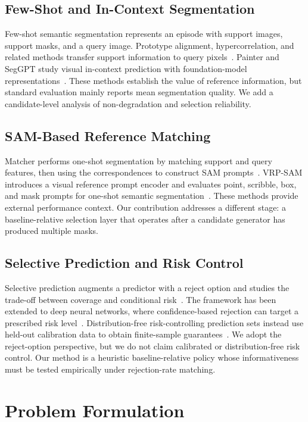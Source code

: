 \documentclass{CVM}
\begin{document}
\subsection{Few-Shot and In-Context Segmentation}

Few-shot semantic segmentation represents an episode with support images, support masks, and a query image. Prototype alignment, hypercorrelation, and related methods transfer support information to query pixels~\cite{3,4,5}. Painter and SegGPT study visual in-context prediction with foundation-model representations~\cite{6,7}. These methods establish the value of reference information, but standard evaluation mainly reports mean segmentation quality. We add a candidate-level analysis of non-degradation and selection reliability.

\subsection{SAM-Based Reference Matching}

Matcher performs one-shot segmentation by matching support and query features, then using the correspondences to construct SAM prompts~\cite{8}. VRP-SAM introduces a visual reference prompt encoder and evaluates point, scribble, box, and mask prompts for one-shot semantic segmentation~\cite{9}. These methods provide external performance context. Our contribution addresses a different stage: a baseline-relative selection layer that operates after a candidate generator has produced multiple masks.

\subsection{Selective Prediction and Risk Control}

Selective prediction augments a predictor with a reject option and studies the trade-off between coverage and conditional risk~\cite{13}. The framework has been extended to deep neural networks, where confidence-based rejection can target a prescribed risk level~\cite{14}. Distribution-free risk-controlling prediction sets instead use held-out calibration data to obtain finite-sample guarantees~\cite{15}. We adopt the reject-option perspective, but we do not claim calibrated or distribution-free risk control. Our method is a heuristic baseline-relative policy whose informativeness must be tested empirically under rejection-rate matching.

\section{Problem Formulation}
\end{document}
